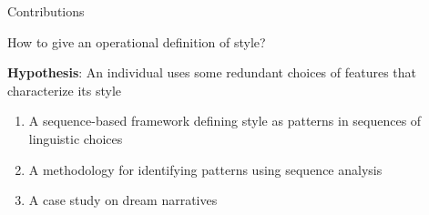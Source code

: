\documentclass[10pt]{beamer}
\begin{document}
\begin{frame}{Contributions}

How to give an operational definition of style?

\vspace{0.25cm}
\pause

\textbf{Hypothesis}: An individual uses some redundant choices of features that characterize its style

\vspace{0.25cm}
\pause



\begin{enumerate}[<+->]
    \item A sequence-based framework defining style as patterns in sequences of linguistic choices%
    \item A methodology for identifying patterns using sequence analysis
    \item A case study on dream narratives %
\end{enumerate}
    
\end{frame}
\end{document}
